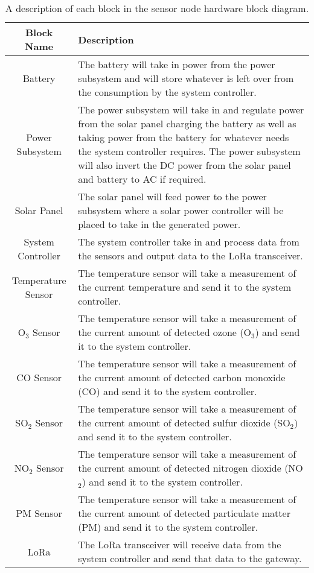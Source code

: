 \begin{table}[H]
    \centering
    \caption{A description of each block in the sensor node hardware block diagram.}
    \begin{tabularx}{\linewidth}{|c|X|}
        \hline
        Block Name & Description \\ 
        \hline\hline
        Battery & The battery will take in power from the power subsystem and will store whatever is left over from the consumption by the system controller. \\\hline
        Power Subsystem & The power subsystem will take in and regulate power from the solar panel charging the battery as well as taking power from the battery for whatever needs the system controller requires. The power subsystem will also invert the DC power from the solar panel and battery to AC if required. \\\hline
        Solar Panel & The solar panel will feed power to the power subsystem where a solar power controller will be placed to take in the generated power. \\\hline
        System Controller & The system controller take in and process data from the sensors and output data to the LoRa transceiver. \\\hline
        Temperature Sensor & The temperature sensor will take a measurement of the current temperature and send it to the system controller. \\\hline
        O$_3$ Sensor & The temperature sensor will take a measurement of the current amount of detected ozone (O$_3$) and send it to the system controller. \\\hline
        CO Sensor & The temperature sensor will take a measurement of the current amount of detected carbon monoxide (CO) and send it to the system controller. \\\hline
        SO$_2$ Sensor & The temperature sensor will take a measurement of the current amount of detected sulfur dioxide (SO$_2$) and send it to the system controller. \\\hline
        NO$_2$ Sensor & The temperature sensor will take a measurement of the current amount of detected nitrogen dioxide (NO$_2$) and send it to the system controller. \\\hline
        PM Sensor & The temperature sensor will take a measurement of the current amount of detected particulate matter (PM) and send it to the system controller. \\\hline
        LoRa & The LoRa transceiver will receive data from the system controller and send that data to the gateway. \\\hline
    \end{tabularx}
    
    \label{tab:Node_Hardware_BD_Description}
\end{table}
